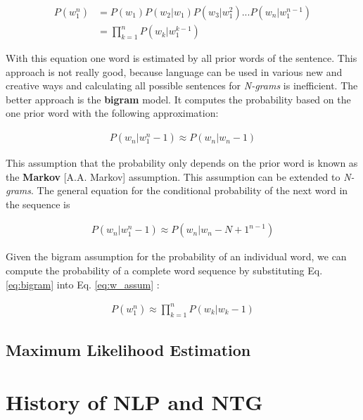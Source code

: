 \begin{equation}\label{eq:w_assum}
\begin{split}
P(w_1^{n}) & = P(w_1)P(w_2|w_1)P(w_3|w_1^{2})...P(w_n|w_1^{n-1}) \\
& = \prod_{k=1}^{n} P(w_k|w_1^{k-1})
\end{split}
\end{equation}

With this equation one word is estimated by all prior words of the sentence. This approach is not really good, because language can be used in various new and creative ways and calculating all possible sentences for \textit{N-grams} is inefficient. The better approach is the \textbf{bigram} model. It computes the probability based on the one prior word with the following approximation:

\begin{equation}\label{eq:bigram}
\begin{split}
P(w_n|w_1^n-1) \approx P(w_n|w_n-1)
\end{split}
\end{equation}

This assumption that the probability only depends on the prior word is known as the \textbf{Markov} [A.A. Markov] assumption. This assumption can be extended to \textit{N-grams}. The general equation for the conditional probability of the next word in the sequence is

\begin{equation}
\begin{split}
P(w_n|w_1^n-1) \approx P(w_n|w_n-N+1^{n-1})
\end{split}
\end{equation}

Given the bigram assumption for the probability of an individual word, we can
compute the probability of a complete word sequence by substituting Eq. \ref{eq:bigram} into
Eq. \ref{eq:w_assum} \cite{LM}:


\begin{equation} 
\begin{split}
P(w_1^{n}) \approx \prod_{k=1}^{n} P(w_k|w_k-1)
\end{split}
\end{equation}

\subsection{Maximum Likelihood Estimation}

\section{History of NLP and NTG}

